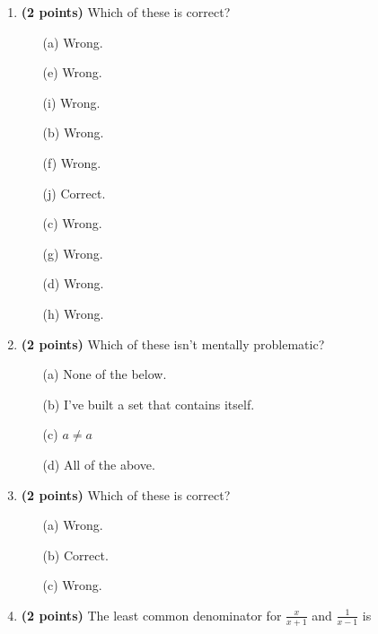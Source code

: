 \documentclass[12pt]{amsart}
\begin{document}
\newpage
\begin{enumerate}
\item {\bf (2 points)} 
 Which of these is correct?

\begin{minipage}[t]{1.0\linewidth}\begin{multicols}{4}\begin{itemize}\item[(a)]  Wrong. \item[(e)]  Wrong. \item[(i)]  Wrong. \item[(b)]  Wrong. \item[(f)]  Wrong. \item[(j)]  Correct. \item[(c)]  Wrong. \item[(g)]  Wrong. \item[] \item[(d)]  Wrong. \item[(h)]  Wrong. \item[] \end{itemize}\end{multicols}\end{minipage} \vfill 
\item {\bf (2 points)} 
 Which of these isn't mentally problematic?

\begin{minipage}[t]{1.0\linewidth}\begin{itemize}\item[(a)]  None of the below.  \item[(b)]  I've built a set that contains itself. \item[(c)]  $a \neq a$ \item[(d)]   All of the above. \end{itemize}\end{minipage} \vfill 
\item {\bf (2 points)} 
 Which of these is correct?

\begin{minipage}[t]{1.0\linewidth}\begin{multicols}{3}\begin{itemize}\item[(a)]  Wrong. \item[(b)]  Correct. \item[(c)]  Wrong. \end{itemize}\end{multicols}\end{minipage} \vfill 
\item {\bf (2 points)} 
 The least common denominator for $\displaystyle \frac{x}{x+1}$ and $\displaystyle \frac{1}{x-1}$ is \vspace{.2cm}


\end{enumerate}
\end{document}
